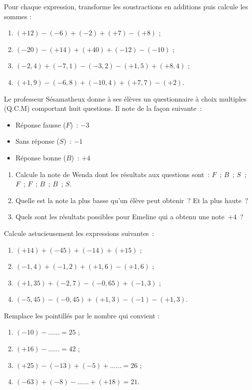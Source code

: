 \begin{exercice}
Pour chaque expression, transforme les soustractions en additions puis calcule les sommes :
\begin{enumerate}
 \item $(+12) - (-6) + (-2) + (+7) - (+8)$ ;
 \item $(-20) - (+14) + (+40) + (-12) - (-10)$ ;
 \item $(-2,4) + (-7,1) - (-3,2) - (+1,5) + (+8,4)$ ;
 \item $(+1,9) - (-6,8) + (-10,4) + (+7,7) - (+2)$.
 \end{enumerate}
\end{exercice}


\begin{exercice}
Le professeur Sésamatheux donne à ses élèves un questionnaire à choix multiples (Q.C.M) comportant huit questions. Il note de la façon suivante :
\begin{itemize}
 \item Réponse fausse ($F$) : $-3$
 \item Sans réponse ($S$) : $-1$
 \item Réponse bonne ($B$) : $+4$
 \end{itemize}
 \begin{enumerate}
 \item Calcule la note de Wenda dont les résultats aux questions sont : $F$ ; $B$ ; $S$ ; $F$ ; $F$ ; $B$ ; $B$ ; $S$. 
 \item Quelle est la note la plus basse qu'un élève peut obtenir ? Et la plus haute ?
 \item Quels sont les résultats possibles pour Emeline qui a obtenu une note $+4$ ?
 \end{enumerate}
\end{exercice}


\begin{exercice}
Calcule astucieusement les expressions suivantes :
\begin{enumerate}
 \item $(+14) + (-45) + (-14) + (+15)$ ;
 \item $(-1,4) + (-1,2) + (+1,6) - (+1,6)$ ;
 \item $(+1,35) + (-2,7) - (-0,65) + (-1,3)$ ;
 \item $(-5,45) - (-0,45) + (+1,3) - (-1) - (+1,3)$.
 \end{enumerate}
\end{exercice}


\begin{exercice}
Remplace les pointillés par le nombre qui convient :
\begin{enumerate}
 \item $(-10) - \ldots \ldots  = 25$ ;
 \item $(+16) - \ldots \ldots  = 42$ ;
 \item $(+25) - (-13) + (-5) + \ldots \ldots = 26$ ;
 \item $(-63) + (-8) - \ldots \ldots + (+18) = 21$.
 \end{enumerate}
\end{exercice}


